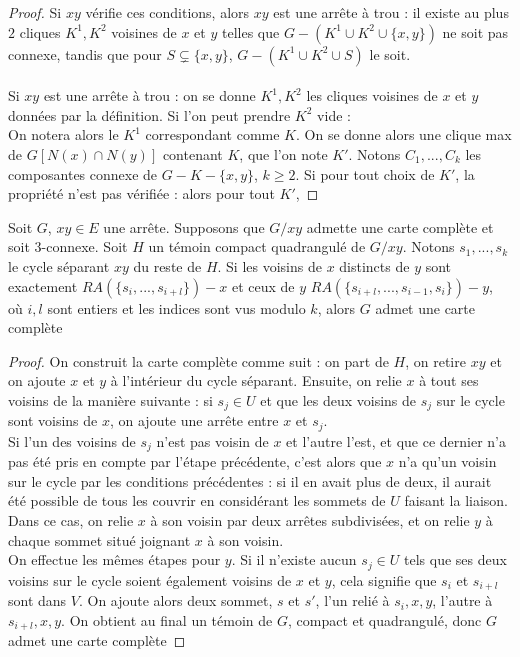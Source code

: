 \documentclass{scrartcl}
\begin{document}
\begin{flushleft}
\begin{prop}
\end{prop}

\begin{proof}
    Si $xy$ vérifie ces conditions, alors $xy$ est une arrête à trou : il existe au plus $2$ cliques $K^1, K^2$ voisines de $x$ et $y$
    telles que $G - (K^1 \cup K^2 \cup \{x,y\})$ ne soit pas connexe, tandis que pour $S \subsetneq \{x,y\}$, $G - (K^1 \cup K^2 \cup S)$
    le soit.
    \\~\\
    Si $xy$ est une arrête à trou : on se donne $K^1, K^2$ les cliques voisines de $x$ et $y$ données par la définition.
    Si l'on peut prendre $K^2$ vide :\\
    On notera alors le $K^1$ correspondant comme $K$. On se donne alors une clique max de $G[N(x) \cap N(y)]$ contenant $K$, que l'on note $K'$.
    Notons $C_1, ..., C_k$ les composantes connexe de $G - K - \{x,y\}$, $k \geq 2$. Si pour tout choix de $K'$, la propriété n'est pas
    vérifiée : alors pour tout $K'$, 
\end{proof}

\begin{prop}\label{ezDecontr}
    Soit $G$, $xy \in E$ une arrête. Supposons que $G / xy$ admette une carte complète et soit $3$-connexe. Soit $H$ un témoin compact
    quadrangulé de $G / xy$. Notons $s_1, ..., s_k$ le cycle séparant $xy$ du reste de $H$.
    Si les voisins de $x$ distincts de $y$ sont exactement $RA(\{s_i, ..., s_{i+l}\}) - x$ et ceux de $y$
    $RA(\{s_{i+l}, ..., s_{i-1}, s_i\}) - y$,
    où $i, l$ sont entiers et les indices sont vus modulo $k$, alors $G$ admet une carte complète
\end{prop}

\begin{proof}
    On construit la carte complète comme suit : on part de $H$, on retire $xy$ et on ajoute $x$ et $y$ à l'intérieur du cycle séparant.
    Ensuite, on relie $x$ à tout ses voisins de la manière suivante : si $s_j \in U$ et que les deux voisins de $s_j$ sur le cycle
    sont voisins de $x$, on ajoute une arrête entre $x$ et $s_j$.\\
    Si l'un des voisins de $s_j$ n'est pas voisin de $x$ et l'autre l'est,
    et que ce dernier n'a pas été pris en compte par l'étape précédente, c'est alors que $x$ n'a qu'un voisin sur le cycle par
    les conditions précédentes : si il en avait plus de deux, il aurait été possible de tous les couvrir en considérant les sommets
    de $U$ faisant la liaison. Dans ce cas, on relie $x$ à son voisin par deux arrêtes subdivisées, et on relie $y$ à chaque sommet
    situé joignant $x$ à son voisin.\\
    On effectue les mêmes étapes pour $y$. Si il n'existe aucun $s_j \in U$ tels que ses deux voisins sur le cycle soient également
    voisins de $x$ et $y$, cela signifie que $s_i$ et $s_{i+l}$ sont dans $V$. On ajoute alors deux sommet, $s$ et $s'$, l'un relié
    à $s_i, x, y$, l'autre à $s_{i+l}, x, y$. On obtient au final un témoin de $G$, compact et quadrangulé, donc $G$ admet une carte
    complète
\end{proof}


\end{flushleft}
\end{document}
